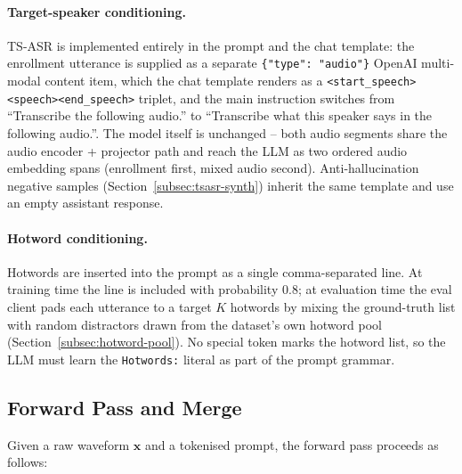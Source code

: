 \paragraph{Target-speaker conditioning.}
TS-ASR is implemented entirely in the prompt and the chat template:
the enrollment utterance is supplied as a separate
\verb|{"type": "audio"}| OpenAI multi-modal content item, which the
chat template renders as a \verb|<start_speech><speech><end_speech>|
triplet, and the main instruction switches from ``Transcribe the
following audio.'' to ``Transcribe what this speaker says in the
following audio.''. The model itself is unchanged -- both audio
segments share the audio encoder + projector path and reach the LLM as
two ordered audio embedding spans (enrollment first, mixed audio
second). Anti-hallucination negative samples
(Section~\ref{subsec:tsasr-synth}) inherit the same template and use an
empty assistant response.

\paragraph{Hotword conditioning.}
Hotwords are inserted into the prompt as a single comma-separated line.
At training time the line is included with probability $0.8$; at
evaluation time the eval client pads each utterance to a target $K$
hotwords by mixing the ground-truth list with random distractors drawn
from the dataset's own hotword pool (Section~\ref{subsec:hotword-pool}).
No special token marks the hotword list, so the LLM must learn the
\verb|Hotwords:| literal as part of the prompt grammar.

\subsection{Forward Pass and Merge}
\label{subsec:merge}

Given a raw waveform $\mathbf{x}$ and a tokenised prompt, the forward
pass proceeds as follows:

